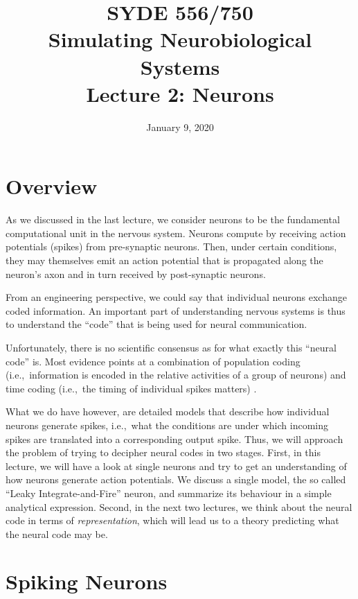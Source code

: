 \documentclass[10pt,letterpaper,oneside]{article}
\date{January 9, 2020}
\title{SYDE 556/750 \\ Simulating Neurobiological Systems \\ Lecture 2: Neurons}
\begin{document}

\section{Overview}

As we discussed in the last lecture, we consider neurons to be the fundamental computational unit in the nervous system. Neurons compute by receiving action potentials (spikes) from pre-synaptic neurons. Then, under certain conditions, they may themselves emit an action potential that is propagated along the neuron's axon and in turn received by post-synaptic neurons.

From an engineering perspective, we could say that individual neurons exchange coded information. An important part of understanding nervous systems is thus to understand the \enquote{code} that is being used for neural communication.

Unfortunately, there is no scientific consensus as for what exactly this \enquote{neural code} is. Most evidence points at a combination of population coding (i.e.,~information is encoded in the relative activities of a group of neurons) and time coding (i.e.,~the timing of individual spikes matters) \cite{rieke1999spikes}.


What we do have however, are detailed models that describe how individual neurons generate spikes, i.e.,~what the conditions are under which incoming spikes are translated into a corresponding output spike. Thus, we will approach the problem of trying to decipher neural codes in two stages. First, in this lecture, we will have a look at single neurons and try to get an understanding of how neurons generate action potentials. We discuss a single model, the so called \enquote{Leaky Integrate-and-Fire} neuron, and summarize its behaviour in a simple analytical expression. Second, in the next two lectures, we think about the neural code in terms of \emph{representation}, which will lead us to a theory predicting what the neural code may be.

\section{Spiking Neurons}
\end{document}
